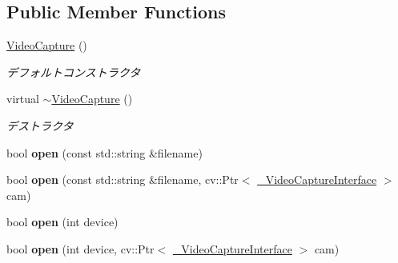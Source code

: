 \subsection*{Public Member Functions}
\begin{DoxyCompactItemize}
\item 
\hypertarget{classskl_1_1_video_capture_a6a80b08bcec34f70cb88c5d0a2673203}{}\label{classskl_1_1_video_capture_a6a80b08bcec34f70cb88c5d0a2673203} 
\hyperlink{classskl_1_1_video_capture_a6a80b08bcec34f70cb88c5d0a2673203}{Video\+Capture} ()
\begin{DoxyCompactList}\small\item\em デフォルトコンストラクタ \end{DoxyCompactList}\item 
\hypertarget{classskl_1_1_video_capture_a7acc372d7e02d7c33de77c3fc0d2b3ef}{}\label{classskl_1_1_video_capture_a7acc372d7e02d7c33de77c3fc0d2b3ef} 
virtual \hyperlink{classskl_1_1_video_capture_a7acc372d7e02d7c33de77c3fc0d2b3ef}{$\sim$\+Video\+Capture} ()
\begin{DoxyCompactList}\small\item\em デストラクタ \end{DoxyCompactList}\item 
\hypertarget{classskl_1_1_video_capture_aed05a9295d8a04e208d79036f93aad64}{}\label{classskl_1_1_video_capture_aed05a9295d8a04e208d79036f93aad64} 
bool {\bfseries open} (const std\+::string \&filename)
\item 
\hypertarget{classskl_1_1_video_capture_af1f5af87dc823381e91e9bf117186896}{}\label{classskl_1_1_video_capture_af1f5af87dc823381e91e9bf117186896} 
bool {\bfseries open} (const std\+::string \&filename, cv\+::\+Ptr$<$ \hyperlink{classskl_1_1___video_capture_interface}{\+\_\+\+Video\+Capture\+Interface} $>$ cam)
\item 
\hypertarget{classskl_1_1_video_capture_a0cf51b1a893f88b68a5fe9b0a68c5002}{}\label{classskl_1_1_video_capture_a0cf51b1a893f88b68a5fe9b0a68c5002} 
bool {\bfseries open} (int device)
\item 
\hypertarget{classskl_1_1_video_capture_ab17630e9ffd76d49873ce5e60f4080f3}{}\label{classskl_1_1_video_capture_ab17630e9ffd76d49873ce5e60f4080f3} 
bool {\bfseries open} (int device, cv\+::\+Ptr$<$ \hyperlink{classskl_1_1___video_capture_interface}{\+\_\+\+Video\+Capture\+Interface} $>$ cam)
\item 
\hypertarget{classskl_1_1_video_capture_aa664b583d72ab38614a28644e7cd39fa}{}\label{classskl_1_1_video_capture_aa664b583d72ab38614a28644e7cd39fa} 

\end{DoxyCompactItemize}

